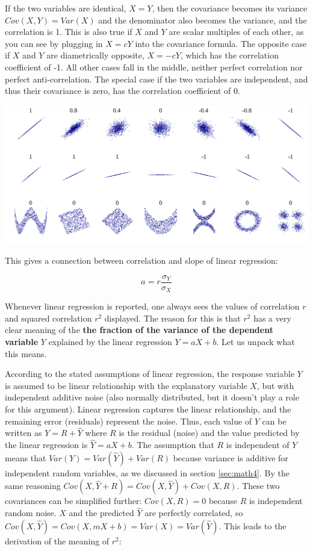 \documentclass[
  letterpaper,
  DIV=11,
  numbers=noendperiod]{scrreprt}
\begin{document}
If the two variables are identical, \(X=Y\), then the covariance becomes
its variance \(Cov(X,Y) = Var(X)\) and the denominator also becomes the
variance, and the correlation is 1. This is also true if \(X\) and \(Y\)
are scalar multiples of each other, as you can see by plugging in
\(X= cY\) into the covariance formula. The opposite case if \(X\) and
\(Y\) are diametrically opposite, \(X = -cY\), which has the correlation
coefficient of -1. All other cases fall in the middle, neither perfect
correlation nor perfect anti-correlation. The special case if the two
variables are independent, and thus their covariance is zero, has the
correlation coefficient of 0.

\includegraphics{./ch8/Correlation_examples.png}
\label{fig:ch8_corr_examples}

This gives a connection between correlation and slope of linear
regression:

\begin{equation}
a = r \frac{\sigma_Y}{\sigma_X}
\label{eq:slope_corr}
\end{equation}

Whenever linear regression is reported, one always sees the values of
correlation \(r\) and squared correlation \(r^2\) displayed. The reason
for this is that \(r^2\) has a very clear meaning of the \textbf{the
fraction of the variance of the dependent variable} \(Y\) explained by
the linear regression \(Y=aX+b\). Let us unpack what this means.

According to the stated assumptions of linear regression, the response
variable \(Y\) is assumed to be linear relationship with the explanatory
variable \(X\), but with independent additive noise (also normally
distributed, but it doesn't play a role for this argument). Linear
regression captures the linear relationship, and the remaining error
(residuals) represent the noise. Thus, each value of \(Y\) can be
written as \(Y = R + \hat Y\) where \(R\) is the residual (noise) and
the value predicted by the linear regression is \(\hat Y =aX+b\). The
assumption that \(R\) is independent of \(Y\) means that
\(Var(Y) = Var (\hat Y) + Var (R)\) because variance is additive for
independent random variables, as we discussed in section
\ref{sec:math4}. By the same reasoning
\(Cov(X,\hat Y + R) = Cov(X,\hat Y) + Cov(X,R)\). These two covariances
can be simplified further: \(Cov(X,R) = 0\) because \(R\) is independent
random noise. \(X\) and the predicted \(\hat Y\) are perfectly
correlated, so \(Cov(X,\hat Y) = Cov(X,mX+b) = Var(X) = Var(\hat Y)\).
This leads to the derivation of the meaning of \(r^2\):
\end{document}
